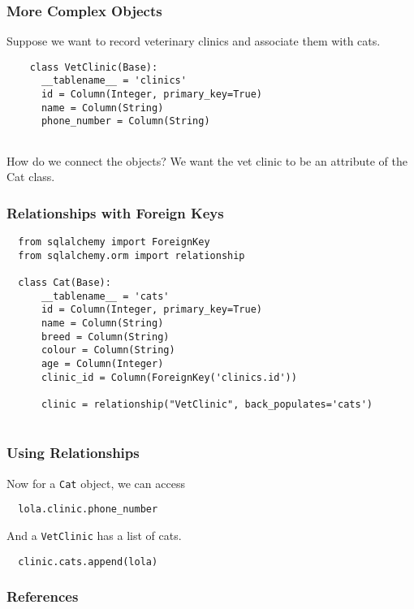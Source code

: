 \documentclass[10pt]{beamer}
\begin{document}
\begin{frame}[fragile]
  \frametitle{More Complex Objects}
  
  Suppose we want to record veterinary clinics and 
  associate them with cats.
  
  \begin{verbatim}
    class VetClinic(Base):
      __tablename__ = 'clinics'
      id = Column(Integer, primary_key=True)
      name = Column(String)
      phone_number = Column(String)
            
  \end{verbatim}
  How do we connect the objects? We want
  the vet clinic to be an attribute of the Cat
  class.
      
\end{frame}
  
\begin{frame}[fragile]
  \frametitle{Relationships with Foreign Keys}
  
  \begin{verbatim}
  from sqlalchemy import ForeignKey
  from sqlalchemy.orm import relationship
  
  class Cat(Base):
      __tablename__ = 'cats'
      id = Column(Integer, primary_key=True)
      name = Column(String)
      breed = Column(String)
      colour = Column(String)
      age = Column(Integer)
      clinic_id = Column(ForeignKey('clinics.id'))
      
      clinic = relationship("VetClinic", back_populates='cats')
      
\end{verbatim}
    
\end{frame}
  
\begin{frame}[fragile]
  \frametitle{Using Relationships}
  
  Now for a \texttt{Cat} object, we can access
  \begin{verbatim}
  lola.clinic.phone_number     
  \end{verbatim}
  
  And a \texttt{VetClinic} has a list of cats.
  \begin{verbatim}
  clinic.cats.append(lola)
  \end{verbatim}
  
\end{frame}
  

\begin{frame}
  \frametitle{References}
  
\end{frame}
\end{document}
